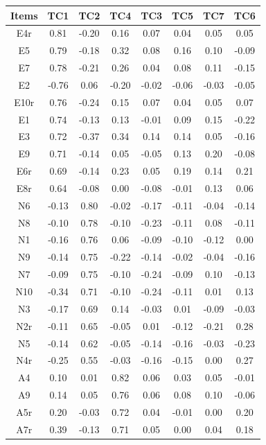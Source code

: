 \documentclass[
  english,
  man]{apa6}
\begin{document}
\begin{table}[tbp]
\begin{center}
\begin{threeparttable}
{\begin{tabular}{cccccccc}
\toprule
Items & \multicolumn{1}{c}{TC1} & \multicolumn{1}{c}{TC2} & \multicolumn{1}{c}{TC4} & \multicolumn{1}{c}{TC3} & \multicolumn{1}{c}{TC5} & \multicolumn{1}{c}{TC7} & \multicolumn{1}{c}{TC6}\\
\midrule
E4r & 0.81 & -0.20 & 0.16 & 0.07 & 0.04 & 0.05 & 0.05\\
E5 & 0.79 & -0.18 & 0.32 & 0.08 & 0.16 & 0.10 & -0.09\\
E7 & 0.78 & -0.21 & 0.26 & 0.04 & 0.08 & 0.11 & -0.15\\
E2 & -0.76 & 0.06 & -0.20 & -0.02 & -0.06 & -0.03 & -0.05\\
E10r & 0.76 & -0.24 & 0.15 & 0.07 & 0.04 & 0.05 & 0.07\\
E1 & 0.74 & -0.13 & 0.13 & -0.01 & 0.09 & 0.15 & -0.22\\
E3 & 0.72 & -0.37 & 0.34 & 0.14 & 0.14 & 0.05 & -0.16\\
E9 & 0.71 & -0.14 & 0.05 & -0.05 & 0.13 & 0.20 & -0.08\\
E6r & 0.69 & -0.14 & 0.23 & 0.05 & 0.19 & 0.14 & 0.21\\
E8r & 0.64 & -0.08 & 0.00 & -0.08 & -0.01 & 0.13 & 0.06\\
N6 & -0.13 & 0.80 & -0.02 & -0.17 & -0.11 & -0.04 & -0.14\\
N8 & -0.10 & 0.78 & -0.10 & -0.23 & -0.11 & 0.08 & -0.11\\
N1 & -0.16 & 0.76 & 0.06 & -0.09 & -0.10 & -0.12 & 0.00\\
N9 & -0.14 & 0.75 & -0.22 & -0.14 & -0.02 & -0.04 & -0.16\\
N7 & -0.09 & 0.75 & -0.10 & -0.24 & -0.09 & 0.10 & -0.13\\
N10 & -0.34 & 0.71 & -0.10 & -0.24 & -0.11 & 0.01 & 0.13\\
N3 & -0.17 & 0.69 & 0.14 & -0.03 & 0.01 & -0.09 & -0.03\\
N2r & -0.11 & 0.65 & -0.05 & 0.01 & -0.12 & -0.21 & 0.28\\
N5 & -0.14 & 0.62 & -0.05 & -0.14 & -0.16 & -0.03 & -0.23\\
N4r & -0.25 & 0.55 & -0.03 & -0.16 & -0.15 & 0.00 & 0.27\\
A4 & 0.10 & 0.01 & 0.82 & 0.06 & 0.03 & 0.05 & -0.01\\
A9 & 0.14 & 0.05 & 0.76 & 0.06 & 0.08 & 0.10 & -0.06\\
A5r & 0.20 & -0.03 & 0.72 & 0.04 & -0.01 & 0.00 & 0.20\\
A7r & 0.39 & -0.13 & 0.71 & 0.05 & 0.00 & 0.04 & 0.18\\

\end{tabular}}
\end{threeparttable}
\end{center}
\end{table}
\end{document}
